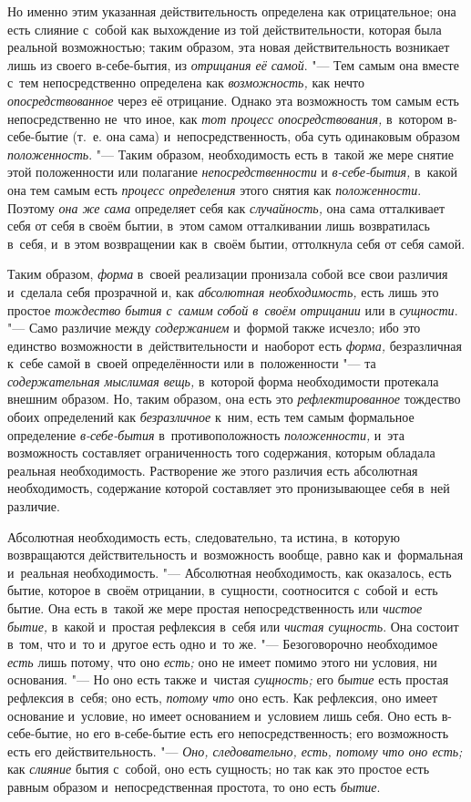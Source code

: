 Но именно этим указанная действительность определена как отрицательное; она
есть слияние с~собой как выхождение из той действительности, которая была
реальной возможностью; таким образом, эта новая действительность возникает
лишь из своего в-себе-бытия, из {\em отрицания её
самой}. "--- Тем самым она вместе с~тем непосредственно определена как
{\em возможность,} как нечто
{\em опосредствованное} через её отрицание. Однако эта
возможность том самым есть непосредственно не~что иное, как
{\em тот процесс опосредствования,} в~котором
в-себе-бытие (т.~е. она сама) и~непосредственность, оба суть одинаковым
образом {\em положенность}. "--- Таким образом,
необходимость есть в~такой же мере снятие этой положенности или полагание
{\em непосредственности} и
{\em в-себе-бытия,} в~какой она тем самым есть
{\em процесс определения} этого снятия как
{\em положенности}. Поэтому
{\em она же сама} определяет себя как
{\em случайность,} она сама отталкивает себя от себя в
своём бытии, в~этом самом отталкивании лишь возвратилась в~себя, и~в этом
возвращении как в~своём бытии, оттолкнула себя от себя самой.

Таким образом, {\em форма} в~своей реализации пронизала
собой все свои различия и~сделала себя прозрачной и, как
{\em абсолютная необходимость,} есть лишь это простое
{\em тождество бытия с~самим собой в~своём отрицании}
или в {\em сущности}. "--- Само различие между
{\em содержанием} и~формой также исчезло; ибо это
единство возможности в~действительности и~наоборот есть
{\em форма,} безразличная к~себе самой в~своей
определённости или в~положенности "--- та
{\em содержательная мыслимая вещь,} в~которой форма
необходимости протекала внешним образом. Но, таким образом, она есть это
{\em рефлектированное} тождество обоих определений как
{\em безразличное} к~ним, есть тем самым формальное
определение {\em в-себе-бытия} в~противоположность
{\em положенности,} и~эта возможность составляет
ограниченность того содержания, которым обладала реальная необходимость.
Растворение же этого различия есть абсолютная необходимость, содержание
которой составляет это пронизывающее себя в~ней различие.

Абсолютная необходимость есть, следовательно, та истина, в~которую
возвращаются действительность и~возможность вообще, равно как и~формальная
и~реальная необходимость. "--- Абсолютная необходимость, как оказалось, есть
бытие, которое в~своём отрицании, в~сущности, соотносится с~собой и~есть
бытие. Она есть в~такой же мере простая непосредственность или
{\em чистое бытие,} в~какой и~простая рефлексия в~себя
или {\em чистая сущность}. Она состоит в~том, что и~то
и~другое есть одно и~то же. "--- Безоговорочно необходимое
{\em есть} лишь потому, что оно
{\em есть;} оно не имеет помимо этого ни условия, ни
основания. "--- Но оно есть также и~чистая {\em сущность;}
его {\em бытие} есть простая рефлексия в~себя; оно
есть, {\em потому что} оно есть. Как рефлексия, оно
имеет основание и~условие, но имеет основанием и~условием лишь себя. Оно
есть в-себе-бытие, но его в-себе-бытие есть его непосредственность; его
возможность есть его действительность. "--- {\em Оно, следовательно, есть,
потому что оно есть;} как {\em слияние} бытия с~собой, оно есть сущность; но
так как это простое есть равным образом и~непосредственная простота, то оно
есть {\em бытие}.

